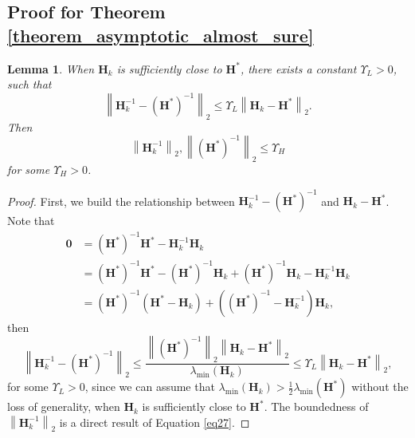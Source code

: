 \documentclass[aos]{imsart}
\numberwithin{equation}{section}
\theoremstyle{plain}
\newtheorem{lemma}{Lemma}
\begin{document}
\begin{appendix}
\subsection{Proof for Theorem \ref{theorem_asymptotic_almost_sure}}
\label{sec:appendix3.3}

\begin{lemma}
\label{lemma26}
    When $\bm{H}_k$ is sufficiently close to $\bm{H}^{*}$, there exists a constant $\Upsilon_{L} > 0$, such that 
    \begin{equation}
    \label{eq27}
         \left\| \bm{H}_k^{-1} - \left(\bm{H}^{*}\right)^{-1}  \right\|_2 \leq  \Upsilon_{L} \left\| \bm{H}_k - \bm{H}^{*} \right\|_2.
    \end{equation}
    Then 
    \begin{equation*}
        \left\|  \bm{H}_k^{-1} \right\|_2, \left\|  \left(\bm{H}^{*}\right)^{-1} \right\|_2 \leq \Upsilon_{H}
    \end{equation*}
    for some $\Upsilon_{H} > 0$.
\end{lemma}


\begin{proof}
     First, we build the relationship between $\bm{H}_k^{-1} - \left(\bm{H}^{*}\right)^{-1}$ and $\bm{H}_k - \bm{H}^{*}$. Note that
    \begin{equation}
        \begin{split}
            \bm{0} & =  \left(\bm{H}^{*}\right)^{-1} \bm{H}^{*} - \bm{H}_k^{-1}\bm{H}_k\\
            & = \left(\bm{H}^{*}\right)^{-1} \bm{H}^{*} - \left(\bm{H}^{*}\right)^{-1} \bm{H}_{k} + \left(\bm{H}^{*}\right)^{-1} \bm{H}_{k} - \bm{H}_k^{-1}\bm{H}_k \\
            & = \left(\bm{H}^{*}\right)^{-1}  \left( \bm{H}^{*} - \bm{H}_{k}  \right) + \left( \left(\bm{H}^{*}\right)^{-1} - \bm{H}_k^{-1}\right) \bm{H}_k ,
        \end{split}
    \end{equation}
    then 
    \begin{equation}
        \left\| \bm{H}_k^{-1} - \left(\bm{H}^{*}\right)^{-1}  \right\|_2 \leq \frac{\left\|\left(\bm{H}^{*}\right)^{-1} \right\|_2 \left\| \bm{H}_k - \bm{H}^{*} \right\|_2}{\lambda_{\min}\left( \bm{H}_{k} \right)} \leq \Upsilon_{L} \left\| \bm{H}_k - \bm{H}^{*} \right\|_2,
    \end{equation}
    for some $\Upsilon_{L}>0$, since we can assume that $\lambda_{\min}\left( \bm{H}_{k} \right) > \frac{1}{2} \lambda_{\min}\left( \bm{H}^{*} \right)$  without the loss of generality, when $\bm{H}_k$ is sufficiently close to $\bm{H}^{*}$. The boundedness of $\left\|  \bm{H}_k^{-1} \right\|_2$ is a direct result of Equation \eqref{eq27}.  
\end{proof}




\end{appendix}
\end{document}
